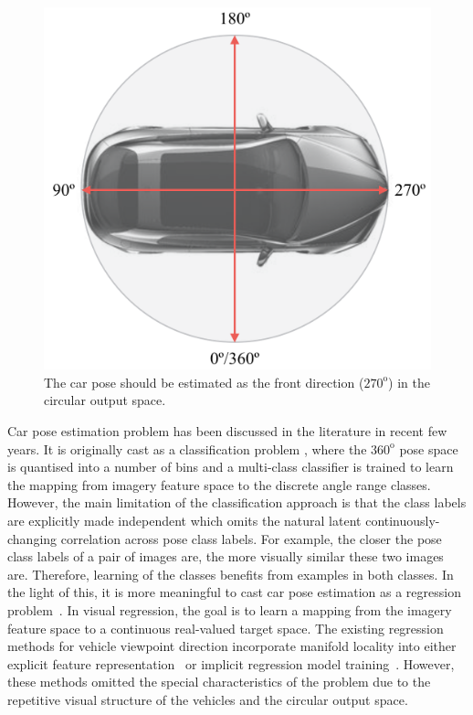 \documentclass{tutmscthesis}[2010/09/22]
\numberwithin{equation}{section}
\numberwithin{table}{section}
\numberwithin{figure}{section}
\begin{document}
\begin{figure}[t]
\centering
\includegraphics[width=0.8\linewidth]{car_pose.png}
\caption{The car pose should be estimated as the front direction ($270^\text{o}$) in the circular output space.}
\label{Fig:carpose} %
\end{figure}


Car pose estimation problem has been discussed in the literature in recent few years. 
It is originally cast as a classification problem \cite{ozuysal2009pose}, where the $360^\text{o}$ pose space is quantised into a number of bins and a multi-class classifier is trained to learn the mapping from imagery feature space to the discrete angle range classes. 
However, the main limitation of the classification approach is that the class labels are explicitly made independent which omits the natural latent continuously-changing correlation across pose class labels. 
For example, the closer the pose class labels of a pair of images are, the more visually similar these two images are. 
Therefore, learning of the classes benefits from examples in both classes. 
In the light of this, it is more meaningful to cast car pose estimation as a regression problem~\cite{torki2011regression,fenzi2013class,hara2014growing}.
In visual regression, the goal is to learn a mapping from the imagery feature space to a continuous real-valued target space. 
The existing regression methods for vehicle viewpoint direction incorporate manifold locality into either explicit feature representation~\cite{torki2011regression,fenzi2013class} or implicit regression model training~\cite{hara2014growing}. 
However, these methods omitted the special characteristics of the problem due to the repetitive visual structure of the vehicles and the circular output space.
 
\end{document}
